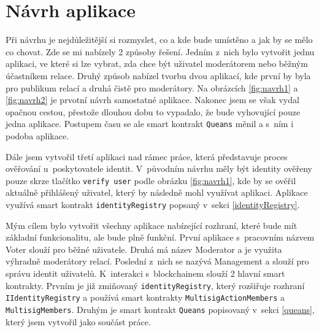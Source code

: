\section{Návrh aplikace}
Při návrhu je nejdůležitější si rozmyslet, co a kde bude umístěno a jak by se mělo co chovat. Zde se mi nabízely 2 způsoby řešení. Jedním z~nich bylo vytvořit jednu aplikaci, ve které si lze vybrat, zda chce být uživatel moderátorem nebo běžným účastníkem relace. Druhý způsob nabízel tvorbu dvou aplikací, kde první by byla pro publikum relací a druhá čistě pro moderátory. Na obrázcích \ref{fig:navrh1} a \ref{fig:navrh2} je prvotní návrh samostatné aplikace. Nakonec jsem se však vydal opačnou cestou, přestože dlouhou dobu to vypadalo, že bude vyhovující pouze jedna aplikace. Postupem času se ale smart kontrakt \texttt{Queans} měnil a s~ním i podoba aplikace. 

Dále jsem vytvořil třetí aplikaci nad rámec práce, která představuje proces ověřování u~poskytovatele identit. V~původním návrhu měly být identity ověřeny pouze skrze tlačítko \texttt{verify user} podle obrázku \ref{fig:navrh1}, kde by se ověřil aktuálně přihlášený uživatel, který by následně mohl využívat aplikaci. Aplikace využívá smart kontrakt \texttt{identityRegistry} popsaný v~sekci \ref{identityRegistry}.

Mým cílem bylo vytvořit všechny aplikace nabízející rozhraní, které bude mít základní funkcionalitu, ale bude plně funkční. První aplikace s~pracovním názvem Voter slouží pro běžné uživatele. Druhá má název Moderator a je využita výhradně moderátory relací. Poslední z~nich se nazývá Management a slouží pro správu identit uživatelů.
K~interakci s~blockchainem slouží 2 hlavní smart kontrakty. Prvním je již zmiňovaný \texttt{identityRegistry}, který rozšiřuje rozhraní \texttt{IIdentityRegistry} a používá smart kontrakty \texttt{MultisigAction\-Members} a \texttt{MultisigMembers}. Druhým je smart kontrakt \texttt{Queans} popisovaný v~sekci \ref{queans}, který jsem vytvořil jako součást práce. 

